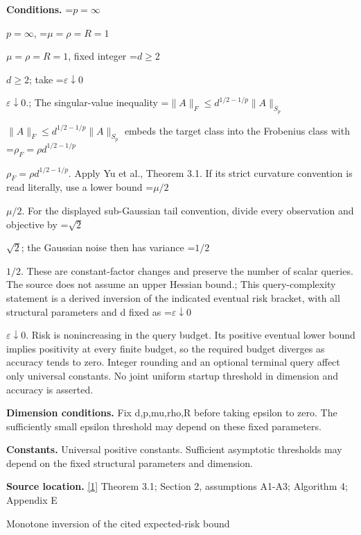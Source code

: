 \documentclass[10pt,a4paper]{article}
\newcommand{\AtlasMath}[1]{\par\begingroup\centering\setbox0=\hbox{$\displaystyle #1$}\ifdim\wd0>1.4\linewidth\typeout{ATLAS WIDE FORMULA: \the\wd0}\fi\ifdim\wd0>\linewidth\resizebox{\linewidth}{!}{\box0}\else\box0\fi\par\endgroup}
\newcommand{\AtlasInlineMath}[1]{\begingroup\setbox0=\hbox{$#1$}\ifdim\wd0>.4\linewidth\endgroup\AtlasMath{#1}\else\endgroup$#1$\fi}
\begin{document}
\textbf{Conditions.} \AtlasInlineMath{p=\infty}, \AtlasInlineMath{\mu=\rho=R=1}, fixed integer \AtlasInlineMath{d\ge2}; take \AtlasInlineMath{\varepsilon\downarrow0}.; The singular-value inequality \AtlasInlineMath{\|A\|_F\le d^{1/2-1/p}\|A\|_{S_p}} embeds the target class into the Frobenius class with \AtlasInlineMath{\rho_F=\rho d^{1/2-1/p}}. Apply Yu et al., Theorem 3.1. If its strict curvature convention is read literally, use a lower bound \AtlasInlineMath{\mu/2}. For the displayed sub-Gaussian tail convention, divide every observation and objective by \AtlasInlineMath{\sqrt2}; the Gaussian noise then has variance \AtlasInlineMath{1/2}. These are constant-factor changes and preserve the number of scalar queries. The source does not assume an upper Hessian bound.; This query-complexity statement is a derived inversion of the indicated eventual risk bracket, with all structural parameters and d fixed as \AtlasInlineMath{\varepsilon\downarrow0}. Risk is nonincreasing in the query budget. Its positive eventual lower bound implies positivity at every finite budget, so the required budget diverges as accuracy tends to zero. Integer rounding and an optional terminal query affect only universal constants. No joint uniform startup threshold in dimension and accuracy is asserted.



\textbf{Dimension conditions.} Fix d,p,mu,rho,R before taking epsilon to zero. The sufficiently small epsilon threshold may depend on these fixed parameters.



\textbf{Constants.} Universal positive constants. Sufficient asymptotic thresholds may depend on the fixed structural parameters and dimension.



\textbf{Source location.} \href{https://papers.nips.cc/paper_files/paper/2024/file/b444ad72520a5f5c467343be88e352ed-Paper-Conference.pdf}{[1]} Theorem 3.1; Section 2, assumptions A1-A3; Algorithm 4; Appendix E



Monotone inversion of the cited expected-risk bound
\end{document}
